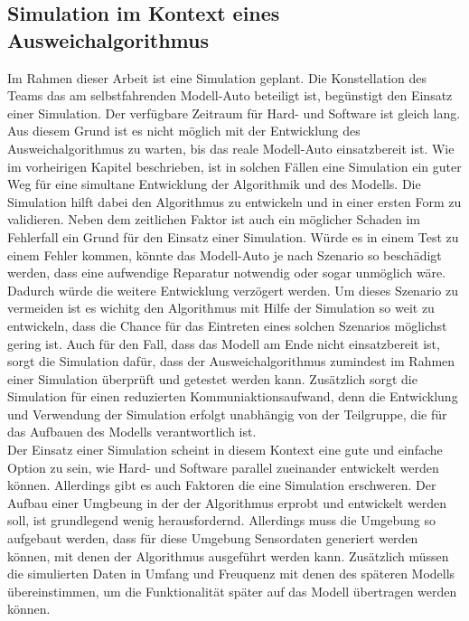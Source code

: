 \subsection{Simulation im Kontext eines Ausweichalgorithmus}
Im Rahmen dieser Arbeit ist eine Simulation geplant. Die Konstellation des Teams das am selbstfahrenden Modell-Auto beteiligt ist, begünstigt den Einsatz einer Simulation. Der verfügbare Zeitraum für Hard- und Software ist gleich lang. 
Aus diesem Grund ist es nicht möglich mit der Entwicklung des Ausweichalgorithmus zu warten, bis das reale Modell-Auto einsatzbereit ist. Wie im vorheirigen Kapitel beschrieben, ist in solchen Fällen eine Simulation ein guter Weg für eine simultane Entwicklung der Algorithmik und des Modells.
Die Simulation hilft dabei den Algorithmus zu entwickeln und in einer ersten Form zu validieren. Neben dem zeitlichen Faktor ist auch ein möglicher Schaden im Fehlerfall ein Grund für den Einsatz einer Simulation. Würde es in einem Test zu einem Fehler kommen, könnte das Modell-Auto je nach Szenario 
so beschädigt werden, dass eine aufwendige Reparatur notwendig oder sogar unmöglich wäre. Dadurch würde die weitere Entwicklung verzögert werden. Um dieses Szenario zu vermeiden ist es wichitg den Algorithmus mit Hilfe der Simulation so weit zu entwickeln, dass die Chance für das Eintreten eines solchen Szenarios möglichst gering ist.
Auch für den Fall, dass das Modell am Ende nicht einsatzbereit ist, sorgt die Simulation dafür, dass der Ausweichalgorithmus zumindest im Rahmen einer Simulation überprüft und getestet werden kann. Zusätzlich sorgt die Simulation für einen reduzierten Kommuniaktionsaufwand, denn die Entwicklung und Verwendung der Simulation erfolgt unabhängig von der Teilgruppe, die für das Aufbauen des Modells verantwortlich ist.\\
Der Einsatz einer Simulation scheint in diesem Kontext eine gute und einfache Option zu sein, wie Hard- und Software parallel zueinander entwickelt werden können. Allerdings gibt es auch Faktoren die eine Simulation erschweren. 
Der Aufbau einer Umgbeung in der der Algorithmus erprobt und entwickelt werden soll, ist grundlegend wenig herausfordernd. Allerdings muss die Umgebung so aufgebaut werden, dass für diese Umgebung Sensordaten generiert werden können,
mit denen der Algorithmus ausgeführt werden kann. Zusätzlich müssen die simulierten Daten in Umfang und Freuquenz mit denen des späteren Modells übereinstimmen, um die Funktionalität später auf das Modell übertragen werden können. 




